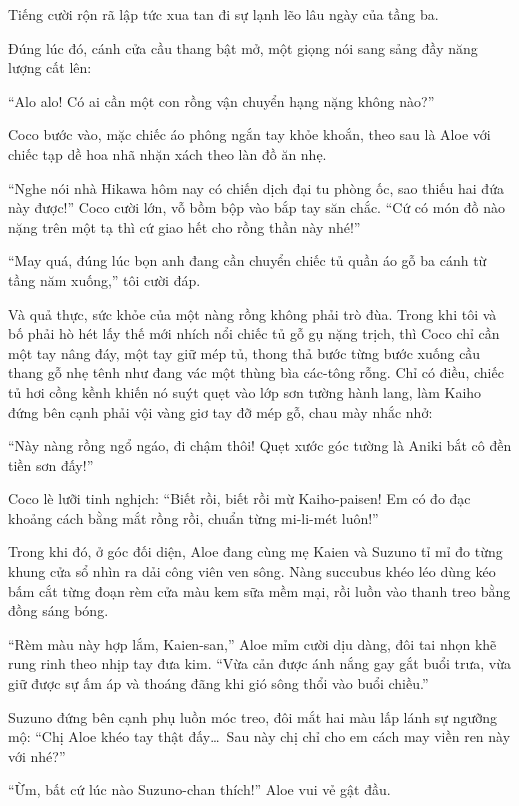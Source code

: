 ﻿\documentclass[../main.tex]{subfiles}
\begin{document}
Tiếng cười rộn rã lập tức xua tan đi sự lạnh lẽo lâu ngày của tầng ba.

Đúng lúc đó, cánh cửa cầu thang bật mở, một giọng nói sang sảng đầy năng lượng cất lên:

``Alo alo! Có ai cần một con rồng vận chuyển hạng nặng không nào?''

Coco bước vào, mặc chiếc áo phông ngắn tay khỏe khoắn, theo sau là Aloe với chiếc tạp dề hoa nhã nhặn xách theo làn đồ ăn nhẹ.

``Nghe nói nhà Hikawa hôm nay có chiến dịch đại tu phòng ốc, sao thiếu hai đứa này được!'' Coco cười lớn, vỗ bồm bộp vào bắp tay săn chắc. ``Cứ có món đồ nào nặng trên một tạ thì cứ giao hết cho rồng thần này nhé!''

``May quá, đúng lúc bọn anh đang cần chuyển chiếc tủ quần áo gỗ ba cánh từ tầng năm xuống,'' tôi cười đáp.

Và quả thực, sức khỏe của một nàng rồng không phải trò đùa. Trong khi tôi và bố phải hò hét lấy thế mới nhích nổi chiếc tủ gỗ gụ nặng trịch, thì Coco chỉ cần một tay nâng đáy, một tay giữ mép tủ, thong thả bước từng bước xuống cầu thang gỗ nhẹ tênh như đang vác một thùng bìa các-tông rỗng. Chỉ có điều, chiếc tủ hơi cồng kềnh khiến nó suýt quẹt vào lớp sơn tường hành lang, làm Kaiho đứng bên cạnh phải vội vàng giơ tay đỡ mép gỗ, chau mày nhắc nhở:

``Này nàng rồng ngổ ngáo, đi chậm thôi! Quẹt xước góc tường là Aniki bắt cô đền tiền sơn đấy!''

Coco lè lưỡi tinh nghịch: ``Biết rồi, biết rồi mừ Kaiho-paisen! Em có đo đạc khoảng cách bằng mắt rồng rồi, chuẩn từng mi-li-mét luôn!''

Trong khi đó, ở góc đối diện, Aloe đang cùng mẹ Kaien và Suzuno tỉ mỉ đo từng khung cửa sổ nhìn ra dải công viên ven sông. Nàng succubus khéo léo dùng kéo bấm cắt từng đoạn rèm cửa màu kem sữa mềm mại, rồi luồn vào thanh treo bằng đồng sáng bóng.

``Rèm màu này hợp lắm, Kaien-san,'' Aloe mỉm cười dịu dàng, đôi tai nhọn khẽ rung rinh theo nhịp tay đưa kim. ``Vừa cản được ánh nắng gay gắt buổi trưa, vừa giữ được sự ấm áp và thoáng đãng khi gió sông thổi vào buổi chiều.''

Suzuno đứng bên cạnh phụ luồn móc treo, đôi mắt hai màu lấp lánh sự ngưỡng mộ: ``Chị Aloe khéo tay thật đấy\dots\ Sau này chị chỉ cho em cách may viền ren này với nhé?''

``Ừm, bất cứ lúc nào Suzuno-chan thích!'' Aloe vui vẻ gật đầu.
\end{document}
